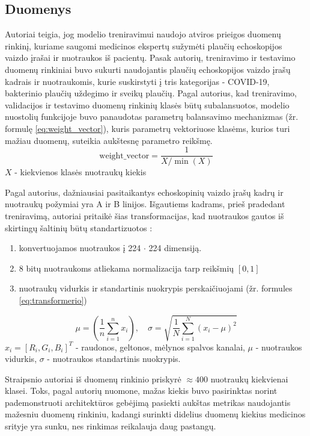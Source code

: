 \documentclass[fleqn]{VUMIFKompMagistrinis}
\begin{document}
\subsection{Duomenys}
Autoriai teigia, jog modelio treniravimui naudojo atviros prieigos duomenų rinkinį, kuriame saugomi medicinos ekspertų sužymėti plaučių echoskopijos vaizdo įrašai ir nuotraukos iš pacientų\cite{PAY21}. Pasak autorių, treniravimo ir testavimo duomenų rinkiniai buvo sukurti naudojantis plaučių echoskopijos vaizdo įrašų kadrais ir nuotraukomis, kurie suskirstyti į tris kategorijas - COVID-19, bakterinio plaučių uždegimo ir sveikų plaučių. Pagal autorius, kad treniravimo, validacijos ir testavimo duomenų rinkinių klasės būtų subalansuotos, modelio nuostolių funkcijoje buvo panaudotas parametrų balansavimo mechanizmas (žr. formulę \ref{eq:weight_vector}), kuris parametrų vektoriuose klasėms, kurios turi mažiau duomenų, suteikia aukštesnę parametro reikšmę.\cite{PAY21}
\begin{equation}\label{eq:weight_vector}
    \text{weight\_vector} = \frac{1}{X/\min(X)}
\end{equation}
\( X \) - kiekvienos klasės nuotraukų kiekis
\par
Pagal autorius, dažniausiai pasitaikantys echoskopinių vaizdo įrašų kadrų ir nuotraukų požymiai yra A ir B linijos. Išgautiems kadrams, prieš pradedant treniravimą, autoriai pritaikė šias transformacijas, kad nuotraukos gautos iš skirtingų šaltinių būtų standartizuotos \cite{PAY21}:
\begin{enumerate}
    \item konvertuojamos nuotraukos į 224 \(\cdot\) 224 dimensiją.
    \item 8 bitų nuotraukoms atliekama normalizacija tarp reikšmių \([0,1]\) 
    \item nuotraukų vidurkis ir standartinis nuokrypis perskaičiuojami (žr. formules \ref{eq:transformerio}) 
\end{enumerate}
\begin{equation}\label{eq:transformerio}
\mu = \left( \frac{1}{n} \sum_{i=1}^{n} x_i \right), \quad
\sigma = \sqrt{\frac{1}{N} \sum_{i=1}^{N} (x_i - \mu)^2}
\end{equation}
\( x_i = [R_i, G_i, B_i]^T \) - raudonos, geltonos, mėlynos spalvos kanalai, \(\mu\) - nuotraukos vidurkis, \(\sigma\) - nuotraukos standartinis nuokrypis. 
\par
Straipsnio autoriai iš duomenų rinkinio priskyrė \(\approx400\) nuotraukų kiekvienai klasei. Toks, pagal autorių nuomone, mažas kiekis buvo pasirinktas norint pademonstruoti architektūros gebėjimą pasiekti aukštas metrikas naudojantis mažesniu duomenų rinkiniu, kadangi surinkti didelius duomenų kiekius medicinos srityje yra sunku, nes rinkimas reikalauja daug pastangų.\cite{PAY21}
\end{document}
